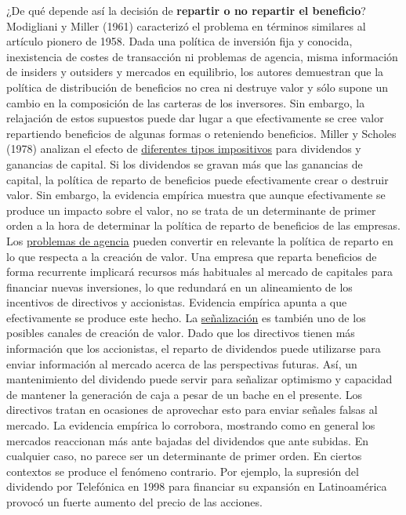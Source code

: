 \documentclass{nuevotema}
\begin{document}
¿De qué depende así la decisión de \textbf{repartir o no repartir el beneficio}? Modigliani y Miller (1961) caracterizó el problema en términos similares al artículo pionero de 1958. Dada una política de inversión fija y conocida, inexistencia de costes de transacción ni problemas de agencia, misma información de insiders y outsiders y mercados en equilibrio, los autores demuestran que la política de distribución de beneficios no crea ni destruye valor y sólo supone un cambio en la composición de las carteras de los inversores. Sin embargo, la relajación de estos supuestos puede dar lugar a que efectivamente se cree valor repartiendo beneficios de algunas formas o reteniendo beneficios. Miller y Scholes (1978) analizan el efecto de \underline{diferentes tipos impositivos} para dividendos y ganancias de capital. Si los dividendos se gravan más que las ganancias de capital, la política de reparto de beneficios puede efectivamente crear o destruir valor. Sin embargo, la evidencia empírica muestra que aunque efectivamente se produce un impacto sobre el valor, no se trata de un determinante de primer orden a la hora de determinar la política de reparto de beneficios de las empresas. Los \underline{problemas de agencia} pueden convertir en relevante la política de reparto en lo que respecta a la creación de valor. Una empresa que reparta beneficios de forma recurrente implicará recursos más habituales al mercado de capitales para financiar nuevas inversiones, lo que redundará en un alineamiento de los incentivos de directivos y accionistas. Evidencia empírica apunta a que efectivamente se produce este hecho. La \underline{señalización} es también uno de los posibles canales de creación de valor. Dado que los directivos tienen más información que los accionistas, el reparto de dividendos puede utilizarse para enviar información al mercado acerca de las perspectivas futuras. Así, un mantenimiento del dividendo puede servir para señalizar optimismo y capacidad de mantener la generación de caja a pesar de un bache en el presente. Los directivos tratan en ocasiones de aprovechar esto para enviar señales falsas al mercado. La evidencia empírica lo corrobora, mostrando como en general los mercados reaccionan más ante bajadas del dividendos que ante subidas. En cualquier caso, no parece ser un determinante de primer orden. En ciertos contextos se produce el fenómeno contrario. Por ejemplo, la supresión del dividendo por Telefónica en 1998 para financiar su expansión en Latinoamérica provocó un fuerte aumento del precio de las acciones. 
\end{document}
